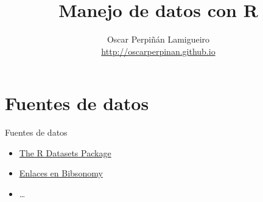 \documentclass[xcolor={usenames,svgnames,dvipsnames}]{beamer}
\author{Oscar Perpiñán Lamigueiro \\ \url{http://oscarperpinan.github.io}}
\date{}
\title{Manejo de datos con R}
\begin{document}
\maketitle


\section{Fuentes de datos}
\label{sec-1}
\begin{frame}[label=sec-1-1]{Fuentes de datos}
\begin{itemize}
\item \href{http://stat.ethz.ch/R-manual/R-patched/library/datasets/html/00Index.html}{The R Datasets Package}

\item \href{http://www.bibsonomy.org/user/procomun/data}{Enlaces en Bibsonomy}

\item \ldots{}
\end{itemize}
\end{frame}
\end{document}
